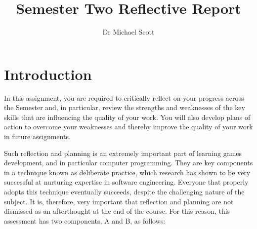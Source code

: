 \documentclass{../fal_assignment}
\title{Semester Two Reflective Report}
\author{Dr Michael Scott}
\begin{document}
\maketitle
%    
\section*{Introduction}

In this assignment, you are required to critically reflect on your progress across the Semester and, in particular, review the strengths and weaknesses of the key skills that are influencing the quality of your work. You will also develop plans of action to overcome your weaknesses and thereby improve the quality of your work in future assignments.

Such reflection and planning is an extremely important part of learning games development, and in particular computer programming. They are key components in a technique known as deliberate practice, which research has shown to be very successful at nurturing expertise in software engineering. Everyone that properly adopts this technique eventually succeeds, despite the challenging nature of the subject. It is, therefore, very important that reflection and planning are not dismissed as an afterthought at the end of the course. For this reason, this assessment has two components, A and B, as follows:
\end{document}
